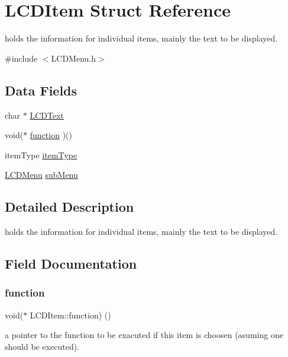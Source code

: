 \hypertarget{structLCDItem}{}\section{L\+C\+D\+Item Struct Reference}
\label{structLCDItem}


holds the information for individual items, mainly the text to be displayed.  




{\ttfamily \#include $<$L\+C\+D\+Menu.\+h$>$}

\subsection*{Data Fields}
\begin{DoxyCompactItemize}
\item 
char $\ast$ \hyperlink{structLCDItem_a07022062a6c79e504d46d9f968ab693d}{L\+C\+D\+Text}
\item 
void($\ast$ \hyperlink{structLCDItem_ac78ba4f8e3ded0edc2cac0e0e29ca631}{function} )()
\item 
item\+Type \hyperlink{structLCDItem_ae5a432eb4dbd8f9a5c37174ba7122b0e}{item\+Type}
\item 
\hyperlink{structLCDMenu}{L\+C\+D\+Menu} \hyperlink{structLCDItem_af072bed397a22183aeba429a133f489d}{sub\+Menu}
\end{DoxyCompactItemize}


\subsection{Detailed Description}
holds the information for individual items, mainly the text to be displayed. 

\subsection{Field Documentation}
\hypertarget{structLCDItem_ac78ba4f8e3ded0edc2cac0e0e29ca631}{}\label{structLCDItem_ac78ba4f8e3ded0edc2cac0e0e29ca631} 
\subsubsection{\texorpdfstring{function}{function}}
{\footnotesize\ttfamily void($\ast$ L\+C\+D\+Item\+::function) ()}

a pointer to the function to be exacuted if this item is choosen (asuming one should be executed).

